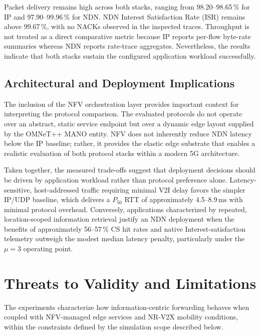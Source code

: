 \documentclass[journal]{IEEEtran}
\begin{document}
Packet delivery remains high across both stacks, ranging from 98.20--98.65\,\% for IP and 97.90--99.96\,\% for NDN. NDN Interest Satisfaction Rate (ISR) remains above 99.67\,\%, with no NACKs observed in the inspected traces. Throughput is not treated as a direct comparative metric because IP reports per-flow byte-rate summaries whereas NDN reports rate-trace aggregates. Nevertheless, the results indicate that both stacks sustain the configured application workload successfully.

\subsection{Architectural and Deployment Implications}

The inclusion of the NFV orchestration layer provides important context for interpreting the protocol comparison. The evaluated protocols do not operate over an abstract, static service endpoint but over a dynamic edge layout supplied by the OMNeT++ MANO entity. NFV does not inherently reduce NDN latency below the IP baseline; rather, it provides the elastic edge substrate that enables a realistic evaluation of both protocol stacks within a modern 5G architecture.

Taken together, the measured trade-offs suggest that deployment decisions should be driven by application workload rather than protocol preference alone. Latency-sensitive, host-addressed traffic requiring minimal V2I delay favors the simpler IP/UDP baseline, which delivers a $P_{50}$ RTT of approximately 4.5--8.9\,ms with minimal protocol overhead. Conversely, applications characterized by repeated, location-scoped information retrieval justify an NDN deployment when the benefits of approximately 56--57\,\% CS hit rates and native Interest-satisfaction telemetry outweigh the modest median latency penalty, particularly under the $\mu=3$ operating point.

\section{Threats to Validity and Limitations}
\label{sec:limits}

The experiments characterize how information-centric forwarding behaves when coupled with NFV-managed edge services and NR-V2X mobility conditions, within the constraints defined by the simulation scope described below.
\end{document}
